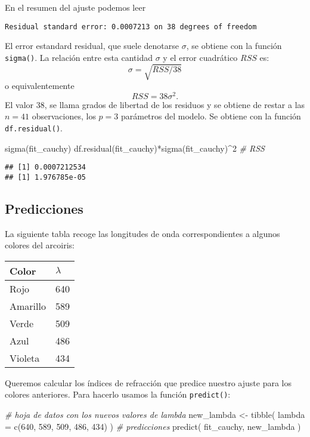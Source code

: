\documentclass[
  degree=mecinf,
  title=normal,
  toc=normal,
  bib=normal]{mnye}
\newenvironment{Shaded}{\begin{snugshade}}{\end{snugshade}}
\newcommand{\AttributeTok}[1]{\textcolor[rgb]{0.77,0.63,0.00}{#1}}
\newcommand{\CommentTok}[1]{\textcolor[rgb]{0.56,0.35,0.01}{\textit{#1}}}
\newcommand{\DecValTok}[1]{\textcolor[rgb]{0.00,0.00,0.81}{#1}}
\newcommand{\FunctionTok}[1]{\textcolor[rgb]{0.00,0.00,0.00}{#1}}
\newcommand{\NormalTok}[1]{#1}
\newcommand{\OtherTok}[1]{\textcolor[rgb]{0.56,0.35,0.01}{#1}}
\newcommand{\SpecialCharTok}[1]{\textcolor[rgb]{0.00,0.00,0.00}{#1}}
\begin{document}
En el resumen del ajuste podemos leer

\texttt{Residual\ standard\ error:\ 0.0007213\ on\ 38\ degrees\ of\ freedom}

El error estandard residual, que suele denotarse \(\sigma\), se obtiene con la función \texttt{sigma()}. La relación entre esta cantidad \(\sigma\) y el error cuadrático \(RSS\) es:
\[\sigma = \sqrt{RSS/38}\]
o equivalentemente
\[RSS=38\sigma^2.\]
El valor \(38\), se llama grados de libertad de los residuos y se obtiene de restar a las \(n=41\) observaciones, los \(p=3\) parámetros del modelo. Se obtiene con la función \texttt{df.residual()}.

\begin{Shaded}
\begin{Highlighting}[]
\FunctionTok{sigma}\NormalTok{(fit\_cauchy)}
\FunctionTok{df.residual}\NormalTok{(fit\_cauchy)}\SpecialCharTok{*}\FunctionTok{sigma}\NormalTok{(fit\_cauchy)}\SpecialCharTok{\^{}}\DecValTok{2} \CommentTok{\# RSS}
\end{Highlighting}
\end{Shaded}

\begin{verbatim}
## [1] 0.0007212534
## [1] 1.976785e-05
\end{verbatim}

\hypertarget{predicciones}{%
\subsection{Predicciones}\label{predicciones}}

La siguiente tabla recoge las longitudes de onda correspondientes a algunos colores del arcoiris:

\begin{longtable}[]{@{}ll@{}}
\toprule
Color & \(\lambda\) \\
\midrule
\endhead
Rojo & 640 \\
Amarillo & 589 \\
Verde & 509 \\
Azul & 486 \\
Violeta & 434 \\
\bottomrule
\end{longtable}

Queremos calcular los índices de refracción que predice nuestro ajuste para los colores anteriores. Para hacerlo usamos la función \texttt{predict()}:

\begin{Shaded}
\begin{Highlighting}[]
\CommentTok{\# hoja de datos con los nuevos valores de lambda}
\NormalTok{new\_lambda }\OtherTok{\textless{}{-}} \FunctionTok{tibble}\NormalTok{( }
        \AttributeTok{lambda =} \FunctionTok{c}\NormalTok{(}\DecValTok{640}\NormalTok{, }\DecValTok{589}\NormalTok{, }\DecValTok{509}\NormalTok{, }\DecValTok{486}\NormalTok{, }\DecValTok{434}\NormalTok{)}
\NormalTok{    )}
\CommentTok{\# predicciones}
\FunctionTok{predict}\NormalTok{(}
\NormalTok{    fit\_cauchy,}
\NormalTok{    new\_lambda}
\NormalTok{)}
\end{Highlighting}
\end{Shaded}
\end{document}
